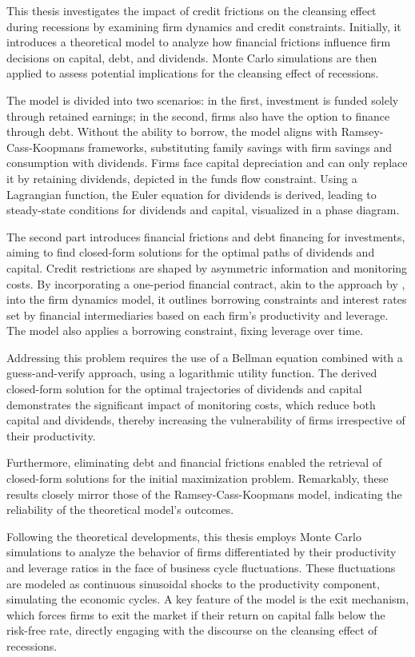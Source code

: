 \documentclass[12pt]{report}
\begin{document}
This thesis investigates the impact of credit frictions on the cleansing effect during recessions by examining firm
dynamics and credit constraints. Initially, it introduces a theoretical model to analyze how financial
frictions influence firm decisions on capital, debt, and dividends. Monte Carlo simulations are then applied to assess
potential implications for the cleansing effect of recessions.

The model is divided into two scenarios: in the first, investment is funded solely through retained earnings; in the
second, firms also have the option to finance through debt. Without the ability to borrow, the model aligns with
Ramsey-Cass-Koopmans frameworks, substituting family savings with firm savings and consumption with dividends. Firms
face capital depreciation and can only replace it by retaining dividends, depicted in the funds flow constraint. Using a
Lagrangian function, the Euler equation for dividends is derived, leading to steady-state conditions for dividends and
capital, visualized in a phase diagram.

The second part introduces financial frictions and debt financing for investments, aiming to find closed-form solutions
for the optimal paths of dividends and capital. Credit restrictions are shaped by asymmetric information and
monitoring costs. By incorporating a one-period financial contract, akin to the approach by \cite{BerGer86}, into the
firm dynamics model, it outlines borrowing constraints and interest rates set by financial intermediaries based on each
firm's productivity and leverage. The model also applies a borrowing constraint, fixing leverage over time.

Addressing this problem requires the use of a Bellman equation combined with a guess-and-verify approach, using a
logarithmic utility function. The derived closed-form solution for the optimal trajectories of dividends and capital
demonstrates the significant impact of monitoring costs, which reduce both capital and dividends, thereby increasing the
vulnerability of firms irrespective of their productivity. 

Furthermore, eliminating debt and financial frictions enabled the retrieval of closed-form solutions for the initial
maximization problem. Remarkably, these results closely mirror those of the Ramsey-Cass-Koopmans model, indicating the
reliability of the theoretical model's outcomes. 

Following the theoretical developments, this thesis employs Monte Carlo simulations to analyze the behavior
of firms differentiated by their productivity and leverage ratios in the face of business cycle fluctuations. These
fluctuations are modeled as continuous sinusoidal shocks to the productivity component, simulating the economic cycles. 
A key feature of the model is the exit mechanism, which forces firms to exit the market if their
return on capital falls below the risk-free rate, directly engaging with the discourse on the cleansing effect of
recessions. 
\end{document}
